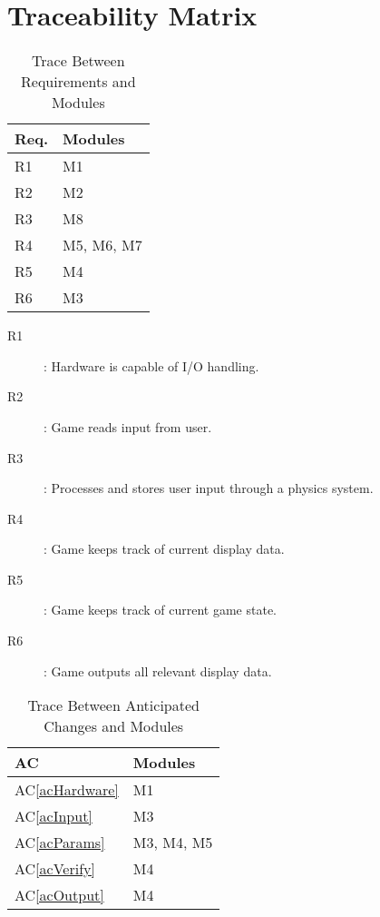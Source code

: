 \documentclass[12pt, titlepage]{article}
\newcommand{\acref}[1]{AC\ref{#1}}
\begin{document}
\section{Traceability Matrix} \label{SecTM}
\begin{table}[H]
\centering
\begin{tabular}{p{} p{}}
\toprule
\textbf{Req.} & \textbf{Modules}\\
\midrule
R1 & M1\\
R2 & M2\\
R3 & M8\\
R4 & M5, M6, M7\\
R5 & M4\\
R6 & M3\\
\bottomrule
\end{tabular}
\caption{Trace Between Requirements and Modules}
\begin{description}
\item[R1]: Hardware is capable of I/O handling. 
\item[R2]: Game reads input from user.
\item[R3]: Processes and stores user input through a physics system.
\item[R4]: Game keeps track of current display data.
\item[R5]: Game keeps track of current game state.
\item[R6]: Game outputs all relevant display data.
\end{description}
\label{TblRT}
\end{table}

\begin{table}[H]
\centering
\begin{tabular}{p{} p{}}
\toprule
\textbf{AC} & \textbf{Modules}\\
\midrule
\acref{acHardware} & M1\\
\acref{acInput} & M3\\
\acref{acParams} & M3, M4, M5\\
\acref{acVerify} & M4\\
\acref{acOutput} & M4\\
\bottomrule
\bottomrule
\end{tabular}
\caption{Trace Between Anticipated Changes and Modules}
\label{TblACT}
\end{table}
\end{document}
